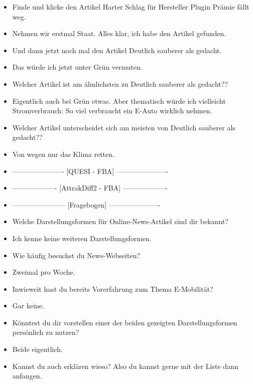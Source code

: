 {\begin{itemize}[]
            \item {} Finde und klicke den Artikel \flqq Harter Schlag für Hersteller Plugin Prämie fällt weg\frqq{}.
            \item {} Nehmen wir erstmal Staat. Alles klar, ich habe den Artikel gefunden.
            \item {} Und dann jetzt noch mal den Artikel \flqq Deutlich sauberer als gedacht\frqq{}.
            \item {} Das würde ich jetzt unter Grün vermuten.
            \item {} Welcher Artikel ist am ähnlichsten zu \flqq Deutlich sauberer als gedacht?\frqq{}?
            \item {} Eigentlich auch bei Grün etwas.
                  Aber thematisch würde ich vielleicht \flqq Stromverbrauch: So viel verbraucht ein E-Auto wirklich\frqq{} nehmen.
            \item {} Welcher Artikel unterscheidet sich am meisten von \flqq Deutlich sauberer als gedacht?\frqq{}?
            \item {} \flqq Von wegen nur das Klima retten\frqq{}.
            \item {----------------------} [QUESI - FBA] {----------------------}
            \item {-------------------} [AttrakDiff2 - FBA] {-------------------}
            \item {-----------------------} [Fragebogen] {----------------------}
            \item {} Welche Darstellungsformen für Online-News-Artikel sind dir bekannt?
            \item {} Ich kenne keine weiteren Darstellungsformen.
            \item {} Wie häufig besuchst du News-Webseiten?
            \item {} Zweimal pro Woche.
            \item {} Inwieweit hast du bereits Vorerfahrung zum Thema E-Mobilität?
            \item {} Gar keine.
            \item {} Könntest du dir vorstellen einer der beiden gezeigten Darstellungsformen persönlich zu nutzen?
            \item {} Beide eigentlich.
            \item {} Kannst du auch erklären wieso? Also du kannst gerne mit der Liste dann anfangen.

\end{itemize}}
